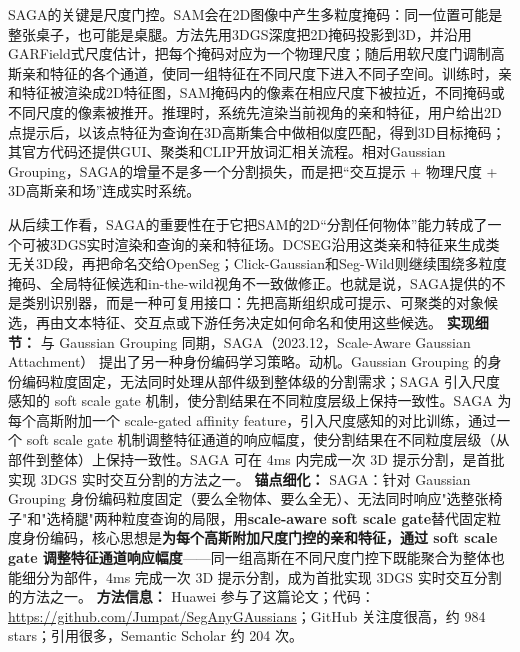 SAGA的关键是尺度门控。SAM会在2D图像中产生多粒度掩码：同一位置可能是整张桌子，也可能是桌腿。方法先用3DGS深度把2D掩码投影到3D，并沿用GARField式尺度估计，把每个掩码对应为一个物理尺度；随后用软尺度门调制高斯亲和特征的各个通道，使同一组特征在不同尺度下进入不同子空间。训练时，亲和特征被渲染成2D特征图，SAM掩码内的像素在相应尺度下被拉近，不同掩码或不同尺度的像素被推开。推理时，系统先渲染当前视角的亲和特征，用户给出2D点提示后，以该点特征为查询在3D高斯集合中做相似度匹配，得到3D目标掩码；其官方代码还提供GUI、聚类和CLIP开放词汇相关流程。相对Gaussian Grouping，SAGA的增量不是多一个分割损失，而是把“交互提示 + 物理尺度 + 3D高斯亲和场”连成实时系统。

从后续工作看，SAGA的重要性在于它把SAM的2D“分割任何物体”能力转成了一个可被3DGS实时渲染和查询的亲和特征场。DCSEG沿用这类亲和特征来生成类无关3D段，再把命名交给OpenSeg；Click-Gaussian和Seg-Wild则继续围绕多粒度掩码、全局特征候选和in-the-wild视角不一致做修正。也就是说，SAGA提供的不是类别识别器，而是一种可复用接口：先把高斯组织成可提示、可聚类的对象候选，再由文本特征、交互点或下游任务决定如何命名和使用这些候选。
\textbf{实现细节：} 与 Gaussian Grouping 同期，SAGA（2023.12，Scale-Aware Gaussian Attachment） 提出了另一种身份编码学习策略。动机。Gaussian Grouping 的身份编码粒度固定，无法同时处理从部件级到整体级的分割需求；SAGA 引入尺度感知的 soft scale gate 机制，使分割结果在不同粒度层级上保持一致性。SAGA 为每个高斯附加一个 scale-gated affinity feature，引入尺度感知的对比训练，通过一个 soft scale gate 机制调整特征通道的响应幅度，使分割结果在不同粒度层级（从部件到整体）上保持一致性。SAGA 可在 4ms 内完成一次 3D 提示分割，是首批实现 3DGS 实时交互分割的方法之一。
\textbf{锚点细化：} SAGA：针对 Gaussian Grouping 身份编码粒度固定（要么全物体、要么全无）、无法同时响应"选整张椅子"和"选椅腿"两种粒度查询的局限，用\textbf{scale-aware soft scale gate}替代固定粒度身份编码，核心思想是\textbf{为每个高斯附加尺度门控的亲和特征，通过 soft scale gate 调整特征通道响应幅度}——同一组高斯在不同尺度门控下既能聚合为整体也能细分为部件，4ms 完成一次 3D 提示分割，成为首批实现 3DGS 实时交互分割的方法之一。
\textbf{方法信息：} Huawei 参与了这篇论文；代码：\url{https://github.com/Jumpat/SegAnyGAussians}；GitHub 关注度很高，约 984 stars；引用很多，Semantic Scholar 约 204 次。



